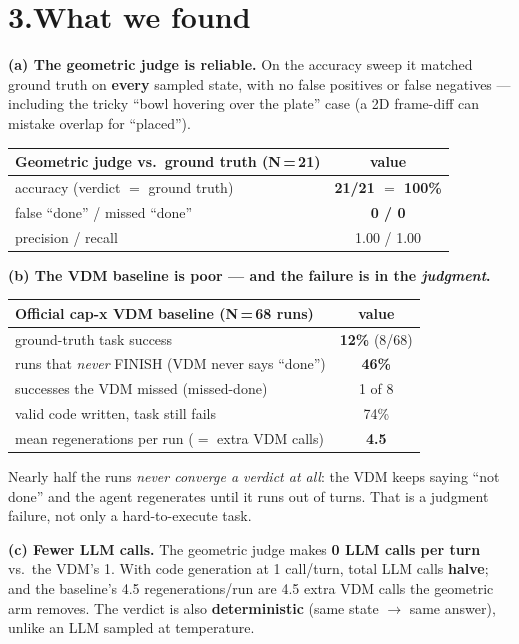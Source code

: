 \documentclass[11pt]{article}
\begin{document}
\section*{3.\quad What we found}

\textbf{(a) The geometric judge is reliable.} On the accuracy sweep it matched ground truth on
\textbf{every} sampled state, with no false positives or false negatives --- including the tricky
``bowl hovering over the plate'' case (a 2D frame-diff can mistake overlap for ``placed'').

\begin{center}\small
\begin{tabular}{lc}
\toprule
Geometric judge vs.\ ground truth (N\,=\,21) & value \\
\midrule
accuracy (verdict $=$ ground truth) & \textbf{21/21 $=$ 100\%} \\
false ``done'' / missed ``done'' & \textbf{0 / 0} \\
precision / recall & 1.00 / 1.00 \\
\bottomrule
\end{tabular}
\end{center}

\textbf{(b) The VDM baseline is poor --- and the failure is in the \emph{judgment}.}

\begin{center}\small
\begin{tabular}{lc}
\toprule
Official cap-x VDM baseline (N\,=\,68 runs) & value \\
\midrule
ground-truth task success & \textbf{12\%} (8/68) \\
runs that \emph{never} FINISH (VDM never says ``done'') & \textbf{46\%} \\
successes the VDM missed (missed-done) & 1 of 8 \\
valid code written, task still fails & 74\% \\
mean regenerations per run ($=$ extra VDM calls) & \textbf{4.5} \\
\bottomrule
\end{tabular}
\end{center}

Nearly half the runs \emph{never converge a verdict at all}: the VDM keeps saying ``not done''
and the agent regenerates until it runs out of turns. That is a judgment failure, not only a
hard-to-execute task.

\textbf{(c) Fewer LLM calls.} The geometric judge makes \textbf{0 LLM calls per turn} vs.\ the
VDM's 1. With code generation at 1 call/turn, total LLM calls \textbf{halve}; and the baseline's
4.5 regenerations/run are 4.5 extra VDM calls the geometric arm removes. The verdict is also
\textbf{deterministic} (same state $\to$ same answer), unlike an LLM sampled at temperature.
\end{document}

